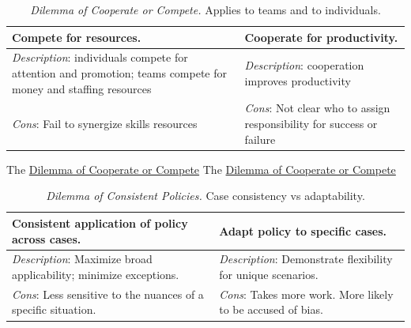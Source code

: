 \begin{center}
\begin{table}[H] %
\begin{tabular}{ | m{\dilemmatablewidth}| m{\dilemmatablewidth} | } 
  \hline
  \textbf{Compete for resources.} &
  \textbf{Cooperate for productivity.} \\
  \hline
  \textit{Description}: individuals compete for attention and promotion; teams compete for money and staffing resources &
  \textit{Description}: cooperation improves productivity \\  
  \hline
  \textit{Cons}: Fail to synergize skills resources & 
  \textit{Cons}: Not clear who to assign responsibility for success or failure \\
  \hline
\end{tabular}
\caption{
\textit{Dilemma of Cooperate or Compete.} 
Applies to teams and to individuals. 
}
\label{table:cooperate-vs-compete}
\end{table}
\end{center}

The \href{table:cooperate-vs-compete}{Dilemma of Cooperate or Compete}
The \href{table:cooperate-vs-compete}{Dilemma of Cooperate or Compete}


\begin{center}
\begin{table}[H] %
\begin{tabular}{ | m{\dilemmatablewidth}| m{\dilemmatablewidth} | }
  \hline
  \textbf{Consistent application of policy across cases.} &
  \textbf{Adapt policy to specific cases.} \\
  \hline
  \textit{Description}: Maximize broad applicability; minimize exceptions. &
  \textit{Description}: Demonstrate flexibility for unique scenarios. \\  
  \hline
  \textit{Cons}: Less sensitive to the nuances of a specific situation. & 
  \textit{Cons}: Takes more work. More likely to be accused of bias. \\
  \hline
\end{tabular}
\caption{
\textit{Dilemma of Consistent Policies.}
Case consistency vs adaptability.
}
\label{table:policy-consistency-across-cases}
\end{table}
\end{center}

